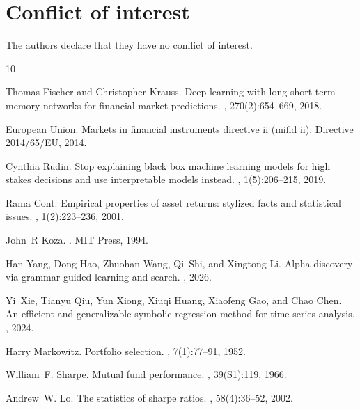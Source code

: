 \documentclass{elektr}
\theoremstyle{corollary}
\theoremstyle{lemma}
\theoremstyle{proposition}
\theoremstyle{axiom}
\theoremstyle{conjecture}
\theoremstyle{example}
\theoremstyle{definition}
\theoremstyle{remark}
\begin{document}
\section*{Conflict of interest}
The authors declare that they have no conflict of interest.

\begin{thebibliography}{10}

Thomas Fischer and Christopher Krauss.
\newblock Deep learning with long short-term memory networks for financial market predictions.
, 270(2):654--669, 2018.

{European Union}.
\newblock Markets in financial instruments directive ii (mifid ii).
\newblock Directive 2014/65/EU, 2014.

Cynthia Rudin.
\newblock Stop explaining black box machine learning models for high stakes decisions and use interpretable models instead.
, 1(5):206--215, 2019.

Rama Cont.
\newblock Empirical properties of asset returns: stylized facts and statistical issues.
, 1(2):223--236, 2001.

John~R Koza.
.
\newblock MIT Press, 1994.

Han Yang, Dong Hao, Zhuohan Wang, Qi~Shi, and Xingtong Li.
\newblock Alpha discovery via grammar-guided learning and search.
, 2026.

Yi~Xie, Tianyu Qiu, Yun Xiong, Xiuqi Huang, Xiaofeng Gao, and Chao Chen.
\newblock An efficient and generalizable symbolic regression method for time series analysis.
, 2024.

Harry Markowitz.
\newblock Portfolio selection.
, 7(1):77--91, 1952.

William~F. Sharpe.
\newblock Mutual fund performance.
, 39(S1):119, 1966.

Andrew~W. Lo.
\newblock The statistics of sharpe ratios.
, 58(4):36--52, 2002.


\end{thebibliography}
\end{document}
